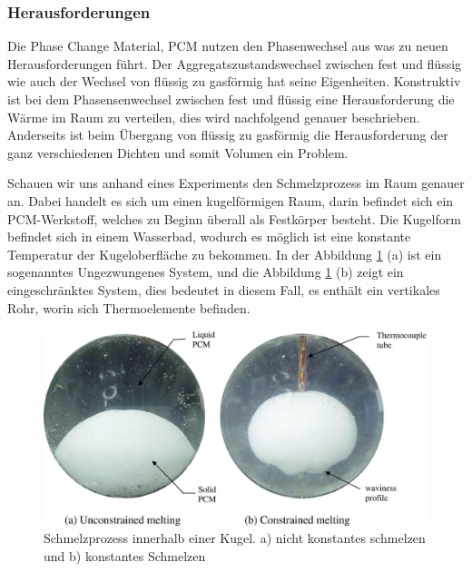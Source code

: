 \documentclass[11pt,a4paper]{scrartcl}
\begin{document}
\subsubsection{Herausforderungen}

Die Phase Change Material, PCM nutzen den Phasenwechsel aus was zu neuen
Herausforderungen führt. Der Aggregatszustandswechsel zwischen fest und flüssig
wie auch der Wechsel von flüssig zu gasförmig hat seine Eigenheiten. Konstruktiv
ist bei dem Phasensenwechsel zwischen fest und flüssig eine Herausforderung die
Wärme im Raum zu verteilen, dies wird nachfolgend genauer beschrieben.
Anderseits ist beim Übergang von flüssig zu gasförmig die Herausforderung der
ganz verschiedenen Dichten und somit Volumen ein Problem.

Schauen wir uns anhand eines Experiments den Schmelzprozess im Raum genauer an.
Dabei handelt es sich um einen kugelförmigen Raum, darin befindet sich ein
PCM-Werkstoff, welches zu Beginn überall als Festkörper besteht. Die Kugelform
befindet sich in einem Wasserbad, wodurch es möglich ist eine konstante
Temperatur der Kugeloberfläche zu bekommen. In der Abbildung
\ref{fig:meltingpaper} (a) ist ein sogenanntes Ungezwungenes System, und die
Abbildung \ref{fig:meltingpaper} (b) zeigt ein eingeschränktes System, dies
bedeutet in diesem Fall, es enthält ein vertikales Rohr, worin sich
Thermoelemente befinden.

\begin{figure}[h!]
\begin{center}
\includegraphics[scale=0.4]{images/Meltinginsidesphere.jpg}
\caption{Schmelzprozess innerhalb einer Kugel. a) nicht konstantes schmelzen und
b) konstantes Schmelzen \cite{WasteEnergyHarvesting}}
\label{fig:meltingpaper}
\end{center}
\end{figure}
\end{document}
